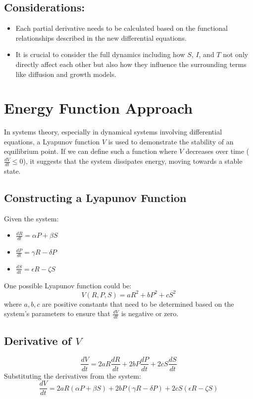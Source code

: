 \documentclass{article}
\begin{document}
\subsection{Considerations:}
\begin{itemize}
  \item Each partial derivative needs to be calculated based on the functional relationships described in the new differential equations.
  \item It is crucial to consider the full dynamics including how \(S\), \(I\), and \(T\) not only directly affect each other but also how they influence the surrounding terms like diffusion and growth models.
\end{itemize}

\section*{Energy Function Approach}
In systems theory, especially in dynamical systems involving differential equations, a Lyapunov function \( V \) is used to demonstrate the stability of an equilibrium point. If we can define such a function where \( V \) decreases over time (\( \frac{dV}{dt} \leq 0 \)), it suggests that the system dissipates energy, moving towards a stable state.

\subsection*{Constructing a Lyapunov Function}
Given the system:
\begin{itemize}
  \item \( \frac{dR}{dt} = \alpha P + \beta S \)
  \item \( \frac{dP}{dt} = \gamma R - \delta P \)
  \item \( \frac{dS}{dt} = \epsilon R - \zeta S \)
\end{itemize}

One possible Lyapunov function could be:
\[ V(R, P, S) = aR^2 + bP^2 + cS^2 \]
where \( a, b, c \) are positive constants that need to be determined based on the system's parameters to ensure that \( \frac{dV}{dt} \) is negative or zero.

\subsection*{Derivative of \( V \)}
\[ \frac{dV}{dt} = 2aR\frac{dR}{dt} + 2bP\frac{dP}{dt} + 2cS\frac{dS}{dt} \]
Substituting the derivatives from the system:
\[ \frac{dV}{dt} = 2aR(\alpha P + \beta S) + 2bP(\gamma R - \delta P) + 2cS(\epsilon R - \zeta S) \]
\end{document}
